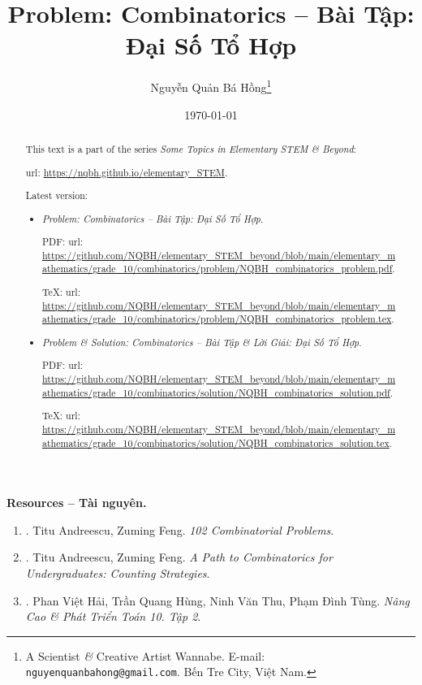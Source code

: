 \documentclass{article}
\title{Problem: Combinatorics -- Bài Tập: Đại Số Tổ Hợp}
\author{Nguyễn Quản Bá Hồng\footnote{A Scientist {\it\&} Creative Artist Wannabe. E-mail: {\tt nguyenquanbahong@gmail.com}. Bến Tre City, Việt Nam.}}
\date{\today}
\begin{document}
\maketitle
\begin{abstract}
	This text is a part of the series {\it Some Topics in Elementary STEM \& Beyond}:
	
	{\sc url}: \url{https://nqbh.github.io/elementary_STEM}.
	
	Latest version:
	\begin{itemize}
		\item {\it Problem: Combinatorics -- Bài Tập: Đại Số Tổ Hợp}.
		
		PDF: {\sc url}: \url{https://github.com/NQBH/elementary_STEM_beyond/blob/main/elementary_mathematics/grade_10/combinatorics/problem/NQBH_combinatorics_problem.pdf}.
		
		\TeX: {\sc url}: \url{https://github.com/NQBH/elementary_STEM_beyond/blob/main/elementary_mathematics/grade_10/combinatorics/problem/NQBH_combinatorics_problem.tex}.
		\item {\it Problem \& Solution: Combinatorics -- Bài Tập \& Lời Giải: Đại Số Tổ Hợp}.
		
		PDF: {\sc url}: \url{https://github.com/NQBH/elementary_STEM_beyond/blob/main/elementary_mathematics/grade_10/combinatorics/solution/NQBH_combinatorics_solution.pdf}.
		
		\TeX: {\sc url}: \url{https://github.com/NQBH/elementary_STEM_beyond/blob/main/elementary_mathematics/grade_10/combinatorics/solution/NQBH_combinatorics_solution.tex}.
	\end{itemize}
\end{abstract}
\tableofcontents


\noindent\textbf{\textsf{Resources -- Tài nguyên.}}
\begin{enumerate}
	\item \cite{Andreescu_Feng_102_combinatorics}. {\sc Titu Andreescu, Zuming Feng}. {\it102 Combinatorial Problems}.
	\item \cite{Andreescu_Feng_path_combinatorics}. {\sc Titu Andreescu, Zuming Feng}. {\it A Path to Combinatorics for Undergraduates: Counting Strategies}.
	\item \cite{Hai_Hung_Thu_Tung_ncpt_Toan_10_tap_2}. {\sc Phan Việt Hải, Trần Quang Hùng, Ninh Văn Thu, Phạm Đình Tùng}. {\it Nâng Cao \& Phát Triển Toán 10. Tập 2}.
\end{enumerate}
\end{document}
